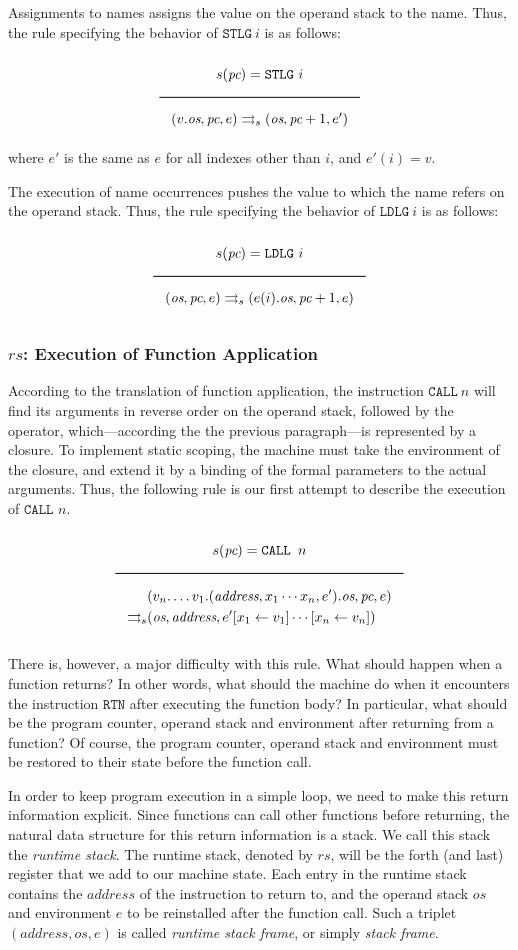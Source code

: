 \begin{appendices}
Assignments to names assigns the value on the operand stack to the name. Thus, the rule specifying the behavior of \(\texttt{STLG}\ i\) is as follows:

$$\Rule{s(\textit{pc}) = \texttt{STLG}\ i}{
(v.\textit{os},\textit{pc},e) \transition (\textit{os},\textit{pc}+1,e')}$$
where \(e'\) is the same as \(e\) for all indexes other than \(i\), and \(e'(i) = v\).

The execution of name occurrences pushes the value to which the name refers on the operand stack. Thus, the rule specifying the behavior of \(\texttt{LDLG}\ i\) is as follows:

$$\Rule{s(\textit{pc}) = \texttt{LDLG}\ i}{
(\textit{os},\textit{pc},e) \transition (e(i).\textit{os},\textit{pc}+1,e)}$$

\subsubsection{\(\textit{rs}\): Execution of Function Application}
\label{sec:org937d2af}
According to the translation of function application, the instruction \(\texttt{CALL}\ n\) will find its arguments in reverse order on the operand stack, followed by the operator, which---according the the previous paragraph---is represented by a closure. To implement static scoping, the machine must take the environment of the closure, and extend it by a binding of the formal parameters to the actual arguments. Thus, the following rule is our first attempt to describe the execution of \(\texttt{CALL } n\).

$$\Rule{s(\textit{pc}) = \texttt{CALL } n}{
\begin{aligned}
&(v_n.\ldots v_1.(\textit{address},x_1\cdots x_n,e').\textit{os},\textit{pc},e)\\
\transition &(\textit{os},\textit{address},e'[x_1 \leftarrow v_1]\cdots[x_n \leftarrow v_n])
\end{aligned}}$$

There is, however, a major difficulty with this rule. What should happen when a function returns? In other words, what should the machine do when it encounters the instruction \(\texttt{RTN}\) after executing the function body? In particular, what should be the program counter, operand stack and environment after returning from a function? Of course, the program counter, operand stack and environment must be restored to their state before the function call.

In order to keep program execution in a simple loop, we need to make this return information explicit. Since functions can call other functions before returning, the natural data structure for this return information is a stack. We call this stack the \emph{runtime stack}. The runtime stack, denoted by \(\textit{rs}\), will be the forth (and last) register that we add to our machine state. Each entry in the runtime stack contains the \(\textit{address}\) of the instruction to return to, and the operand stack \(\textit{os}\) and environment \(e\) to be reinstalled after the function call. Such a triplet \((\textit{address},\textit{os},e)\) is called \emph{runtime stack frame}, or simply \emph{stack frame}.


\end{appendices}

